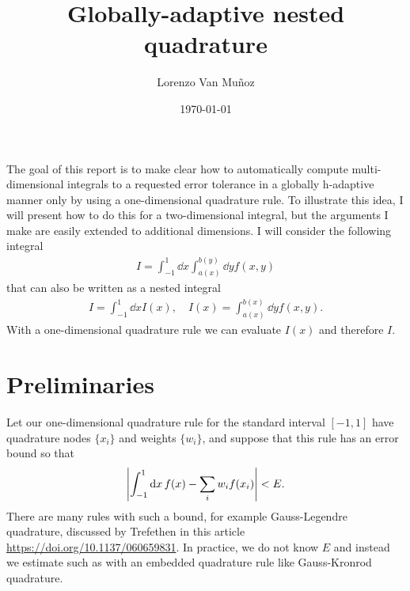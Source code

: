 \documentclass{article}
\title{Globally-adaptive nested quadrature}
\author{Lorenzo Van Mu\~noz}
\date{\today}
\begin{document}
\maketitle

The goal of this report is to make clear how to automatically compute
multi-dimensional integrals to a requested error tolerance in a globally
h-adaptive manner only by using a
one-dimensional quadrature rule. To illustrate this idea, I will present how to
do this for a two-dimensional integral, but the arguments I make are easily
extended to additional dimensions. I will consider the following integral
\begin{align}
    \label{eqn:2dint}
    I = \int_{-1}^{1} \dd{x} \int_{a(x)}^{b(y)} \dd{y} f(x,y)
\end{align}
that can also be written as a nested integral
\begin{align}
    I = \int_{-1}^{1} \dd{x} I(x),
    \quad
    I(x) = \int_{a(x)}^{b(x)} \dd{y} f(x,y).
\end{align}
With a one-dimensional quadrature rule we can evaluate $I(x)$ and therefore $I$.

\section{Preliminaries}

Let our one-dimensional quadrature rule for the standard interval $[-1,1]$ have
quadrature nodes $\{x_i\}$ and weights $\{w_i\}$, and suppose that this rule has
an error bound so that
\begin{align}
    \label{eqn:rulebound}
    \abs{\int_{-1}^{1} \dd{x} f(x) - \sum_{i} w_i f(x_i)} < E.
\end{align}
There are many rules with such a bound, for example Gauss-Legendre quadrature,
discussed by Trefethen in this article \url{https://doi.org/10.1137/060659831}.
In practice, we do not know $E$ and instead we estimate such as with an embedded
quadrature rule like Gauss-Kronrod quadrature.
\end{document}
